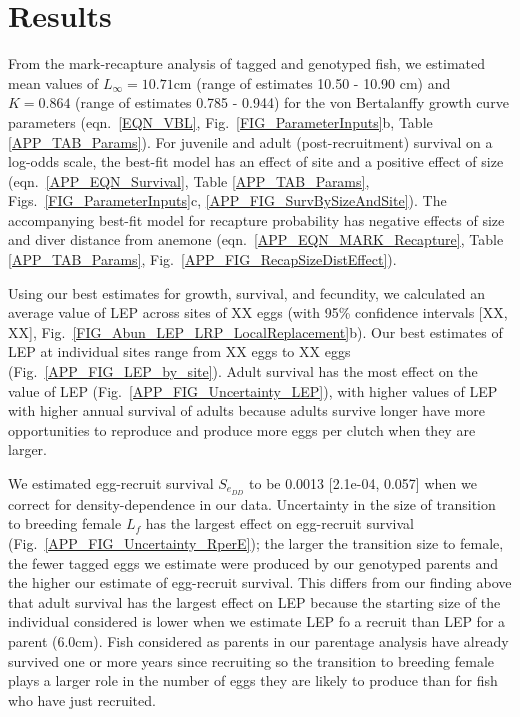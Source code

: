 \documentclass[12pt, oneside]{article}   	%
\begin{document}
\section*{Results}  
From the mark-recapture analysis of tagged and genotyped fish, we estimated mean values of $L_\infty = 10.71 \text{cm}$ (range of estimates 10.50 - 10.90 cm) and $K = 0.864$ (range of estimates 0.785 - 0.944) for the von Bertalanffy growth curve parameters (eqn.\ \ref{EQN_VBL}, Fig.\ \ref{FIG_ParameterInputs}b, Table \ref{APP_TAB_Params}). For juvenile and adult (post-recruitment) survival on a log-odds scale, the best-fit model has an effect of site and a positive effect of size (eqn.\ \ref{APP_EQN_Survival}, Table \ref{APP_TAB_Params}, Figs.\ \ref{FIG_ParameterInputs}c, \ref{APP_FIG_SurvBySizeAndSite}). The accompanying best-fit model for recapture probability has negative effects of size and diver distance from anemone (eqn.\ \ref{APP_EQN_MARK_Recapture}, Table \ref{APP_TAB_Params}, Fig.\ \ref{APP_FIG_RecapSizeDistEffect}).

Using our best estimates for growth, survival, and fecundity, we calculated an average value of LEP across sites of XX eggs (with 95\% confidence intervals [XX, XX], Fig.\ \ref{FIG_Abun_LEP_LRP_LocalReplacement}b). Our best estimates of LEP at individual sites range from XX eggs to XX eggs (Fig.\ \ref{APP_FIG_LEP_by_site}). Adult survival has the most effect on the value of LEP (Fig.\ \ref{APP_FIG_Uncertainty_LEP}), with higher values of LEP with higher annual survival of adults because adults survive longer have more opportunities to reproduce and produce more eggs per clutch when they are larger.

We estimated egg-recruit survival $S_{e_{DD}}$ to be 0.0013 [2.1e-04, 0.057] when we correct for density-dependence in our data. Uncertainty in the size of transition to breeding female $L_f$ has the largest effect on egg-recruit survival (Fig.\ \ref{APP_FIG_Uncertainty_RperE}); the larger the transition size to female, the fewer tagged eggs we estimate were produced by our genotyped parents and the higher our estimate of egg-recruit survival. This differs from our finding above that adult survival has the largest effect on LEP because the starting size of the individual considered is lower when we estimate LEP fo a recruit than LEP for a parent (6.0cm). Fish considered as parents in our parentage analysis have already survived one or more years since recruiting so the transition to breeding female plays a larger role in the number of eggs they are likely to produce than for fish who have just recruited. %
\end{document}
